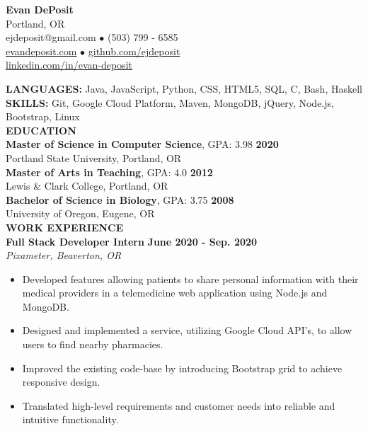 \documentclass[11pt]{article}
\begin{document}
\thispagestyle{empty}
\begin{center}
\noindent \Large{\textbf{Evan DePosit}}\\
\large{Portland, OR}\\
\large{ejdeposit@gmail.com $\bullet$ (503) 799 - 6585}\\
\href{http://evandeposit.com}{\large{evandeposit.com}} $\bullet$
\href{http://github.com/ejdeposit}{\large{github.com/ejdeposit}}\\
\href{http://www.linkedin.com/in/evan-deposit}{\large{linkedin.com/in/evan-deposit}}
\end{center}
\medskip
\textbf{LANGUAGES:} Java, JavaScript, Python, CSS, HTML5, SQL, C, Bash, Haskell\medskip \\
\textbf{SKILLS:} Git, Google Cloud Platform, Maven, MongoDB, jQuery, Node.js, Bootstrap, Linux
\bigskip\\
\noindent
\makebox[0pt][l]{\rule[-.2\baselineskip]{\linewidth}{.3mm}}%
\large{\textbf{EDUCATION}} \smallskip \\
%
\textbf{Master of Science in Computer Science}, GPA: 3.98
\hfill \textbf{2020}\\ 
Portland State University, Portland, OR
\medskip \\
%
\textbf{Master of Arts in Teaching}, GPA: 4.0
\hfill \textbf{2012}\\
Lewis \& Clark College, Portland, OR
\medskip \\
%
\textbf{Bachelor of Science in Biology}, GPA: 3.75
\hfill \textbf{2008}\\
University of Oregon, Eugene, OR
\bigskip\\
\makebox[0pt][l]{\rule[-.2\baselineskip]{\linewidth}{.3mm}}%
\large{\textbf{WORK EXPERIENCE}}\smallskip \\
%
\textbf{Full Stack Developer Intern} \hfill \textbf{June 2020 - Sep. 2020}\\
\textsl{Pixameter, Beaverton, OR} 
\begin{itemize}[leftmargin=*, itemsep=0pt, topsep=5pt]
	\item Developed features allowing patients to share personal information with their medical providers in a telemedicine web application using Node.js and MongoDB.
	\item Designed and implemented a service, utilizing Google Cloud API's, to allow users to find nearby pharmacies.
	\item Improved the existing code-base by introducing Bootstrap grid to achieve responsive design.
	\item Translated high-level requirements and customer needs into reliable and intuitive functionality.
\end{itemize}
\end{document}
